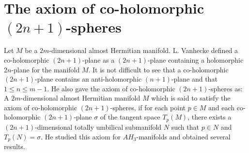 \documentclass{amsart}
\newtheorem*{theorem A}{Theorem A}
\newtheorem*{theorem B}{N\"olker's Theorem}
\theoremstyle{remark}
\theoremstyle{remark}
\theoremstyle{definition}
\numberwithin{equation}{section}
\begin{document}
\section{The axiom of co-holomorphic $(2n+1)$-spheres}

Let $M$ be a $2m$-dimensional almost Hermitian manifold. L. Vanhecke
\cite{Vanh} defined a co-holomorphic $(2n+1)$-plane as a
$(2n+1)$-plane containing a holomorphic $2n$-plane for the manifold
$M$. It is not difficult to see that a co-holomorphic $(2n+1)$-plane
contains an anti-holomorphic $(n+1)$-plane and that $1\leq n\leq
m-1$. He also gave the axiom of co-holomorphic $(2n+1)$-spheres as:
A $2m$-dimensional almost Hermitian manifold $M$ which is said to
satisfy the axiom of co-holomorphic $(2n+1)$-spheres, if for each
point $p\in M$ and each co-holomorphic $(2n+1)$-plane $\sigma$ of
the tangent space $T_{p}(M)$, there exists a $(2n+1)$-dimensional
totally umbilical submanifold $N$ such that $p\in N$ and
$T_{p}(N)=\sigma.$
He studied this axiom for $AH_{3}$-manifolds and obtained several results.\\
\end{document}
